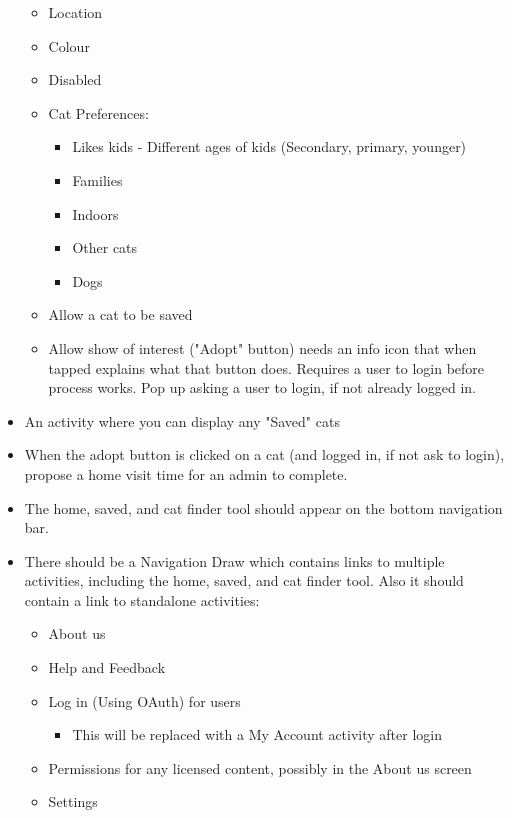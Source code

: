 \begin{itemize}
\begin{itemize}
            \item Location
            \item Colour
            \item Disabled
            \item Cat Preferences:
            \begin{itemize}
                \item Likes kids - Different ages of kids (Secondary, primary, younger)
                \item Families
                \item Indoors
                \item Other cats
                \item Dogs
            \end{itemize}
            \item Allow a cat to be saved
            \item Allow show of interest ("Adopt" button) needs an info icon that when tapped explains what that button does. Requires a user to login before process works. Pop up asking a user to login, if not already logged in.
        \end{itemize}
    \item An activity where you can display any "Saved" cats
    \item When the adopt button is clicked on a cat (and logged in, if not ask to login), propose a home visit time for an admin to complete.
    \item The home, saved, and cat finder tool should appear on the bottom navigation bar.
    \item There should be a Navigation Draw which contains links to multiple activities, including the home, saved, and cat finder tool. Also it should contain a link to standalone activities:
        \begin{itemize}
            \item About us
            \item Help and Feedback
            \item Log in (Using OAuth) for users
                \begin{itemize}
                    \item This will be replaced with a My Account activity after login
                \end{itemize}
            \item Permissions for any licensed content, possibly in the About us screen
            \item Settings

\end{itemize}
\end{itemize}
